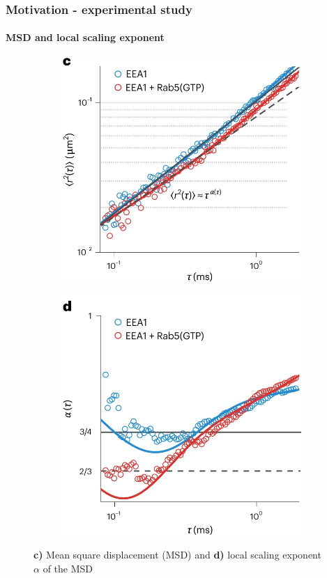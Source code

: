 \documentclass[handout]{beamer}
\begin{document}
\begin{frame}
    \frametitle{Motivation - experimental study}
    \framesubtitle{MSD and local scaling exponent}
    \centering
    \begin{figure}[h]
        \centering
        \begin{subfigure}[b]{0.49\textwidth}
            \centering
            \includegraphics[width=\textwidth]{./Singh_intro_с.png}
        \end{subfigure}
        \begin{subfigure}[b]{0.49\textwidth}
            \centering
            \includegraphics[width=\textwidth]{./Singh_intro_d.png}
        \end{subfigure}
        \caption{
            \textbf{c)} Mean square displacement (MSD) and \textbf{d)}
            local scaling exponent $\alpha$ of the MSD \cite{Singh:2022}
        }
    \end{figure}


\end{frame}
\end{document}
